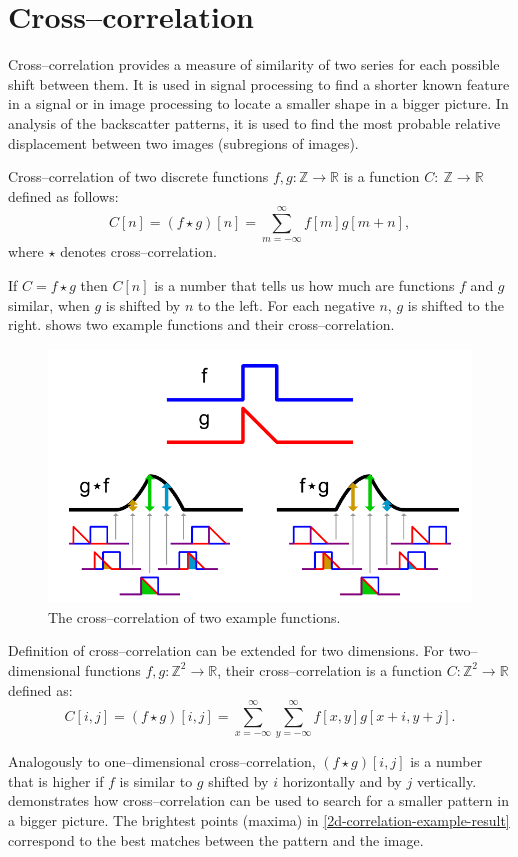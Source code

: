 \section{Cross--correlation}
\label{cross-corr-def}
Cross--correlation provides a measure of similarity of two series for each possible shift between them. It is used in signal processing to find a shorter known feature in a signal or in image processing to locate a smaller shape in a bigger picture. In analysis of the backscatter patterns, it is used to find the most probable relative displacement between two images (subregions of images).

Cross--correlation of two discrete functions $f, g: \mathbb{Z} \rightarrow \mathbb{R}$ is a function $C:~\mathbb{Z} \rightarrow \mathbb{R}$ defined as follows:
\[
C[n] = (f \star g)[n] = \sum_{m=-\infty}^{\infty}f[m]g[m+n],
\]
where $\star$ denotes cross--correlation.

If $C = f \star g$ then $C[n]$ is a number that tells us how much are functions $f$ and $g$ similar, when $g$ is shifted by $n$ to the left. For each negative $n$, $g$ is shifted to the right.  shows two example functions and their cross--correlation.

\begin{figure}
	\centering
	\includegraphics[width=0.7\linewidth]{img/correlation}
	\caption{The cross--correlation of two example functions\cite{correlation_example}.}
	\label{correlation-example}
\end{figure}

Definition of cross--correlation can be extended for two dimensions. For two--dimensional functions $f, g: \mathbb{Z}^2 \rightarrow \mathbb{R}$, their cross--correlation is a function $C: \mathbb{Z}^2 \rightarrow \mathbb{R}$ defined as:
\[
C[i,j] = (f \star g)[i,j] = \sum_{x=-\infty}^{\infty}\sum_{y=-\infty}^{\infty}f[x,y]g[x+i,y+j].
\]

Analogously to one--dimensional cross--correlation, $(f \star g)[i,j]$ is a number that is higher if $f$ is similar to $g$ shifted by $i$ horizontally and by $j$ vertically.  demonstrates how cross--correlation can be used to search for a smaller pattern in a bigger picture. The brightest points (maxima) in \cref{2d-correlation-example-result} correspond to the best matches between the pattern and the image.

